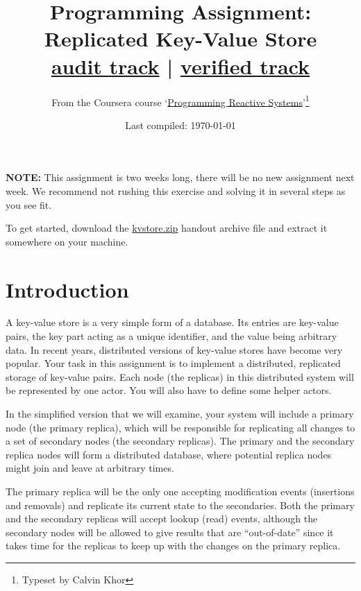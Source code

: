 \documentclass{article}
\begin{document}
\title{Programming Assignment: Replicated Key-Value Store \\ \small \href{https://www.coursera.org/learn/scala-akka-reactive/programming/dt8Ku/replicated-key-value-store-audit-track}{audit track} | \href{https://www.coursera.org/learn/scala-akka-reactive/programming/cVXJU/replicated-key-value-store-verified-track}{verified track} }
\author{  From the Coursera course `\href{https://www.coursera.org/learn/scala-akka-reactive/home/welcome}{Programming Reactive Systems}'\footnote{Typeset by Calvin Khor}  }

\date{Last compiled: \today}
\maketitle
\tableofcontents
\newpage 
\textbf{NOTE:} This assignment is two weeks long, there will  be no new assignment next week. We recommend not rushing this exercise  and solving it in several steps as you see fit.

To get started,
download the \href{https://moocs.scala-lang.org/~dockermoocs/handouts/scala-3/kvstore.zip}{kvstore.zip}
handout archive file and extract it somewhere on your machine.

\section{Introduction}\label{s:intro}
A key-value store is a very simple form of a database. Its entries are key-value pairs, the key part acting as a unique identifier, and the value being arbitrary data. In recent years, distributed versions of key-value stores have become very popular. Your task in this assignment is to implement a distributed, replicated storage of key-value pairs. Each node (the replicas) in this distributed system will be represented by one actor. You will also have to define some helper actors.

In the simplified version that we will examine, your system will include a primary node (the primary replica), which will be responsible for replicating all changes to a set of secondary nodes (the secondary replicas). The primary and the secondary replica nodes will form a distributed database, where potential replica nodes might join and leave at arbitrary times.

The primary replica will be the only one accepting modification events (insertions and removals) and replicate its current state to the secondaries. Both the primary and the secondary replicas will accept lookup (read) events, although the secondary nodes will be allowed to give results that are ``out-of-date'' since it takes time for the replicas to keep up with the changes on the primary replica.
\end{document}
